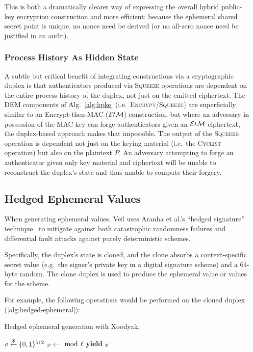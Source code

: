 This is both a dramatically clearer way of expressing the overall hybrid public-key encryption construction and more
efficient: because the ephemeral shared secret point is unique, no nonce need be derived (or no all-zero nonce need be
justified in an audit).

\subsubsection{Process History As Hidden State}

A subtle but critical benefit of integrating constructions via a cryptographic duplex is that authenticators produced
via \textsc{Squeeze} operations are dependent on the entire process history of the duplex, not just on the emitted
ciphertext.
The DEM components of Alg.~\ref{alg:hpke} (i.e.\ \textsc{Encrypt}/\textsc{Squeeze}) are superficially similar to an
Encrypt-then-MAC ($\mathcal{E}t\mathcal{M}$) construction, but where an adversary in possession of the MAC key can forge authenticators
given an $\mathcal{E}t\mathcal{M}$ ciphertext, the duplex-based approach makes that impossible.
The output of the \textsc{Squeeze} operation is dependent not just on the keying material (i.e.\ the \textsc{Cyclist}
operation) but also on the plaintext $P$.
An adversary attempting to forge an authenticator given only key material and ciphertext will be unable to reconstruct
the duplex's state and thus unable to compute their forgery.

\subsection{Hedged Ephemeral Values}\label{subsec:cons-hedged-ephemeral-values}

When generating ephemeral values, Veil uses Aranha et al.'s ``hedged signature'' technique~\cite{aranha2020} to mitigate
against both catastrophic randomness failures and differential fault attacks against purely deterministic schemes.

Specifically, the duplex's state is cloned, and the clone absorbs a context-specific secret value (e.g.\ the signer's
private key in a digital signature scheme) and a 64-byte random.
The clone duplex is used to produce the ephemeral value or values for the scheme.

For example, the following operations would be performed on the cloned duplex (\ref{alg:hedged-ephemeral}):

\begin{algorithm}[ht]
    \caption{Hedged ephemeral generation with Xoodyak.}
    \begin{algorithmic}[0]
        \Clone {}
        \State {}
        \State $v \stackrel{\$}{\gets} \{0,1\}^{512}$
        \State {}
        \State $x \gets$  $\bmod~\ell$
        \State \textbf{yield} $x$
        \End {}
    \end{algorithmic}
    \label{alg:hedged-ephemeral}
\end{algorithm}

